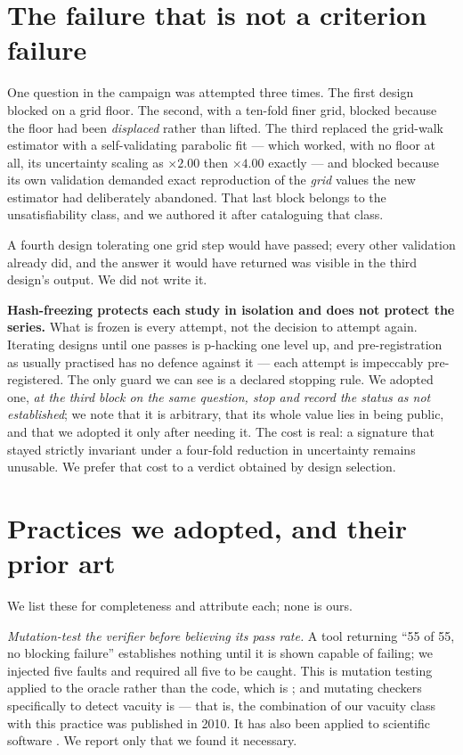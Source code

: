 \documentclass[11pt,a4paper]{article}
\begin{document}
\section{The failure that is not a criterion failure}
\label{sec:serie}

One question in the campaign was attempted three times. The first design blocked on a grid
floor. The second, with a ten-fold finer grid, blocked because the floor had been
\emph{displaced} rather than lifted. The third replaced the grid-walk estimator with a
self-validating parabolic fit --- which worked, with no floor at all, its uncertainty scaling
as $\times2.00$ then $\times4.00$ exactly --- and blocked because its own validation demanded
exact reproduction of the \emph{grid} values the new estimator had deliberately abandoned.
That last block belongs to the unsatisfiability class, and we authored it after cataloguing
that class.

A fourth design tolerating one grid step would have passed; every other validation already
did, and the answer it would have returned was visible in the third design's output. We did
not write it.

\textbf{Hash-freezing protects each study in isolation and does not protect the series.} What
is frozen is every attempt, not the decision to attempt again. Iterating designs until one
passes is p-hacking one level up, and pre-registration as usually practised has no defence
against it --- each attempt is impeccably pre-registered. The only guard we can see is a
declared stopping rule. We adopted one, \emph{at the third block on the same question, stop
and record the status as not established}; we note that it is arbitrary, that its whole value
lies in being public, and that we adopted it only after needing it. The cost is real: a
signature that stayed strictly invariant under a four-fold reduction in uncertainty remains
unusable. We prefer that cost to a verdict obtained by design selection.

\section{Practices we adopted, and their prior art}
\label{sec:pratiques}

We list these for completeness and attribute each; none is ours.

\emph{Mutation-test the verifier before believing its pass rate.} A tool returning ``55 of
55, no blocking failure'' establishes nothing until it is shown capable of failing; we
injected five faults and required all five to be caught. This is mutation testing
\citep{jia2010} applied to the oracle rather than the code, which is \citet{knauth2009}; and
mutating checkers specifically to detect vacuity is \citet{date2010} --- that is, the
combination of our vacuity class with this practice was published in 2010. It has also been
applied to scientific software \citep{hook2009}. We report only that we found it necessary.
\end{document}
